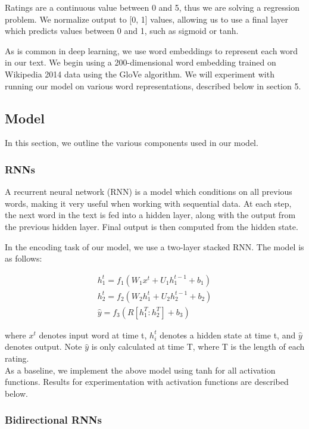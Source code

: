 \documentclass{article} %
\begin{document}
Ratings are a continuous value between 0 and 5, thus we are solving a regression
problem. We normalize output to [0, 1] values, allowing us to use a final layer
which predicts values between 0 and 1, such as sigmoid or tanh.

As is common in deep learning, we use word embeddings to represent each word in
our text. We begin using a 200-dimensional word embedding trained on Wikipedia
2014 data using the GloVe algorithm. We will experiment with running our model
on various word representations, described below in section 5.

\subsection{Model}

In this section, we outline the various components used in our model.

\subsubsection{RNNs}

A recurrent neural network (RNN) is a model which conditions on all previous
words, making it very useful when working with sequential data. At each step,
the next word in the text is fed into a hidden layer, along with the output from
the previous hidden layer. Final output is then computed from the hidden state.

In the encoding task of our model, we use a two-layer stacked RNN. The model is
as follows:

\begin{gather}
h_1^t = f_1(W_1 x^t + U_1 h_1^{t-1} + b_1) \\
h_2^t = f_2(W_2 h_1^t + U_2 h_2^{t-1} + b_2) \\
\hat{y} = f_3(R[h_1^T:h_2^T] + b_3)
\end{gather}

where $x^t$ denotes input word at time t, $h_i^t$ denotes a hidden state at time
t, and $\hat{y}$ denotes output. Note $\hat{y}$ is only calculated at time T,
where T is the length of each rating. \\

As a baseline, we implement the above model using tanh for all activation
functions. Results for experimentation with activation functions are described
below.

\subsubsection{Bidirectional RNNs}
\end{document}
